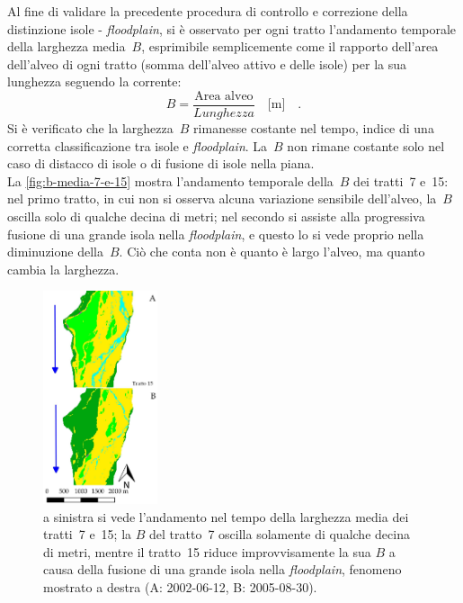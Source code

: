 \begin{description}
Al fine di validare la precedente procedura di controllo e correzione della distinzione isole - \emph{floodplain}, si è osservato per ogni tratto l'andamento temporale della larghezza media~$B$, esprimibile semplicemente come il rapporto dell'area dell'alveo di ogni tratto (somma dell'alveo attivo e delle isole) per la sua lunghezza seguendo la corrente:
	\begin{equation}
		\label{eq:larghezza-tratto}
		B = \frac{\text{Area alveo}}{Lunghezza} 
		\quad 
		\si{[\m]}
		\quad.
	\end{equation}
	Si è verificato che la larghezza~$B$ rimanesse costante nel tempo, indice di una corretta classificazione tra isole e \emph{floodplain}. 
	La~$B$ non rimane costante solo nel caso di distacco di isole o di fusione di isole nella piana. 
	\\
	La \cref{fig:b-media-7-e-15} mostra l'andamento temporale della~$B$ dei tratti~7 e~15: nel primo tratto, in cui non si osserva alcuna variazione sensibile dell'alveo, la~$B$ oscilla solo di qualche decina di metri; nel secondo si assiste alla progressiva fusione di una grande isola nella \emph{floodplain}, e questo lo si vede proprio nella diminuzione della~$B$. Ciò che conta non è quanto è largo l'alveo, ma quanto cambia la larghezza.
	\begin{figure}
		\centering
		
		\quad
		\includegraphics[width=0.3\textwidth]{files/fusione_isola_tr_15.jpeg}
		\caption[andamento temporale di $B$ per i tratti~7 e~15]{a sinistra si vede l'andamento nel tempo della larghezza media dei tratti~7 e~15; la $B$ del tratto~7 oscilla solamente di qualche decina di metri, mentre il tratto~15 riduce improvvisamente la sua $B$ a causa della fusione di una grande isola nella \emph{floodplain}, fenomeno mostrato a destra (A: 2002-06-12, B: 2005-08-30).}

\end{figure}
\end{description}
